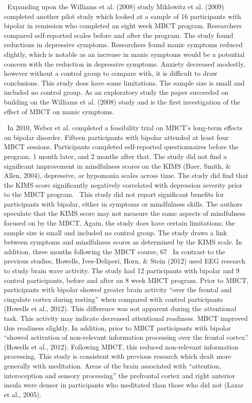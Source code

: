 { Expanding upon the Williams et al. (2008) study Miklowitz et al. (2009) completed another pilot study which looked at a sample of 16 participants with bipolar in remission who completed an eight week MBCT program. Researchers compared self-reported scales before and after the program. The study found reductions in depressive symptoms. Researchers found manic symptoms reduced slightly, which is notable as an increase in manic symptoms would be a potential concern with the reduction in depressive symptoms. Anxiety decreased modestly, however without a control group to compare with, it is difficult to draw conclusions. This study does have some limitations. The sample size is small and included no control group. As an exploratory study the paper succeeded on building on the Williams et al. (2008) study and is the first investigation of the effect of MBCT on manic symptoms.

 In 2010, Weber et al. completed a feasibility trial on MBCT’s long-term effects on bipolar disorder. Fifteen participants with bipolar attended at least four MBCT sessions. Participants completed self-reported questionnaires before the program, 1 month later, and 2 months after that. The study did not find a significant improvement in mindfulness scores on the KIMS (Baer, Smith, & Allen, 2004), depressive, or hypomania scales across time. The study did find that the KIMS score significantly negatively correlated with depression severity prior to the MBCT program.
 This study did not report significant benefits for participants with bipolar, either in symptoms or mindfulness skills. The authors speculate that the KIMS score may not measure the same aspects of mindfulness focused on by the MBCT. Again, the study does have certain limitations; the sample size is small and included no control group. The study draws a link between symptoms and mindfulness scores as determined by the KIMS scale. In addition, three months following the MBCT course, 67%
 In contrast to the previous studies, Howells, Ives-Deliperi, Horn, & Stein (2012) used EEG research to study brain wave activity. The study had 12 participants with bipolar and 9 control participants, before and after an 8 week MBCT program. Prior to MBCT, participants with bipolar showed greater brain activity “over the frontal and cingulate cortex during resting” when compared with control participants (Howells et al., 2012). This difference was not apparent during the attentional task. This activity may indicate decreased attentional readiness. MBCT improved this readiness slightly. In addition, prior to MBCT participants with bipolar “showed activation of non-relevant information processing over the frontal cortex” (Howells et al., 2012). Following MBCT, this reduced non-relevant information processing. This study is consistent with previous research which dealt more generally with meditation. Areas of the brain associated with “attention, interoception and sensory processing” the prefrontal cortex and right anterior insula were denser in participants who meditated than those who did not (Lazar et al., 2005).

}

